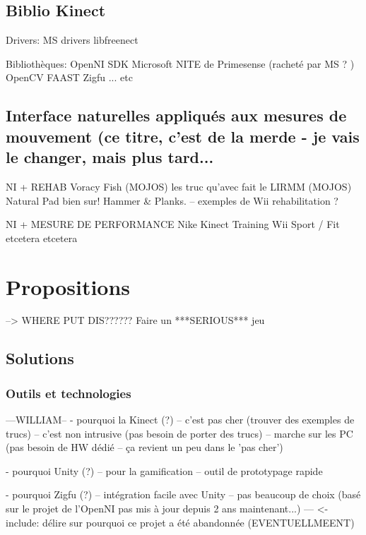 \documentclass{report}
\begin{document}
	
		\section{Biblio Kinect}
		
		Drivers:
		MS drivers
		libfreenect
		
		Bibliothèques:
		OpenNI
		SDK Microsoft
		NITE de Primesense (racheté par MS ? )
		OpenCV
		FAAST
		Zigfu
		... etc
		
		
		\section{Interface naturelles appliqués aux mesures de mouvement 
		(ce titre, c'est de la merde - je vais le changer, mais plus tard...}

		NI + REHAB
		Voracy Fish (MOJOS)
		les truc qu'avec fait le LIRMM (MOJOS)
 		Natural Pad bien sur! Hammer \& Planks.
		-- exemples de Wii rehabilitation ?
		
		NI + MESURE DE PERFORMANCE
		Nike Kinect Training
		Wii Sport / Fit
		etcetera etcetera
		
		
	\chapter{Propositions}
	
	
	
		--> WHERE PUT DIS?????? Faire un ***SERIOUS*** jeu
		
		
		
		\section{Solutions}
		
		\subsection{Outils et technologies} 		---WILLIAM--
		- pourquoi la Kinect (?)
		-- c'est pas cher (trouver des exemples de trucs)
		-- c'est non intrusive (pas besoin de porter des trucs)
		-- marche sur les PC (pas besoin de HW dédié -- ça revient un peu dans le 'pas cher')
		
		- pourquoi Unity (?)
		-- pour la gamification
		-- outil de prototypage rapide
		
		- pourquoi Zigfu (?)
		-- intégration facile avec Unity
		-- pas beaucoup de choix (basé sur le projet de l'OpenNI pas mis à jour depuis 2 ans maintenant...)
		--- <- include: délire sur pourquoi ce projet a été abandonnée (EVENTUELLMEENT)
		
\end{document}
